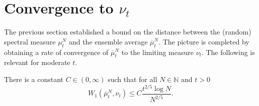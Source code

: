 \section{Convergence to \texorpdfstring{$\nu_t$}{nu t}}\label{s.nut}

The previous section established a bound on the distance between the (random) spectral measure $\mu^N_t$ and the ensemble average $\overline{\mu}^N_t$. The picture is completed by obtaining a rate of convergence of $\overline{\mu}^N_t$ to the limiting measure $\nu_t$. The following is relevant for moderate $t$.

\begin{thm}\label{T:avg-to-limit}
There is a constant $C\in(0,\infty)$ such that for all $N\in\mathbb{N}$ and $t>0$
\[
W_1(\overline{\mu}^N_t,\nu_t) \le C\frac{t^{2/5}\log N}{N^{2/5}}.
\]
\end{thm}

